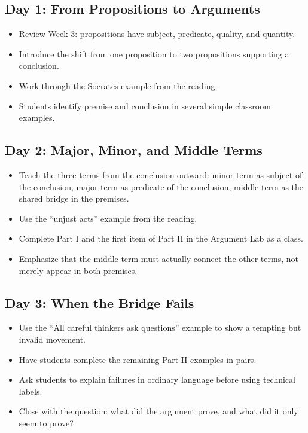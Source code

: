 \documentclass[12pt]{article}
\begin{document}
\subsection*{Day 1: From Propositions to Arguments}
\begin{itemize}[leftmargin=*]
\item Review Week 3: propositions have subject, predicate, quality, and quantity.
\item Introduce the shift from one proposition to two propositions supporting a conclusion.
\item Work through the Socrates example from the reading.
\item Students identify premise and conclusion in several simple classroom examples.
\end{itemize}

\subsection*{Day 2: Major, Minor, and Middle Terms}
\begin{itemize}[leftmargin=*]
\item Teach the three terms from the conclusion outward: minor term as subject of the conclusion, major term as predicate of the conclusion, middle term as the shared bridge in the premises.
\item Use the ``unjust acts'' example from the reading.
\item Complete Part I and the first item of Part II in the Argument Lab as a class.
\item Emphasize that the middle term must actually connect the other terms, not merely appear in both premises.
\end{itemize}

\subsection*{Day 3: When the Bridge Fails}
\begin{itemize}[leftmargin=*]
\item Use the ``All careful thinkers ask questions'' example to show a tempting but invalid movement.
\item Have students complete the remaining Part II examples in pairs.
\item Ask students to explain failures in ordinary language before using technical labels.
\item Close with the question: what did the argument prove, and what did it only seem to prove?
\end{itemize}
\end{document}
